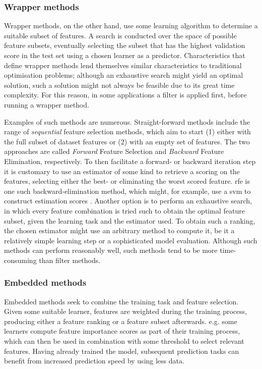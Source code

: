 \documentclass{article}
\begin{document}
\subsubsection{Wrapper methods}
Wrapper methods, on the other hand, use some learning algorithm to determine a suitable subset of features. A search is conducted over the space of possible feature subsets, eventually selecting the subset that has the highest validation score in the test set using a chosen learner as a predictor. Characteristics that define wrapper methods lend themselves similar characteristics to traditional optimisation problems; although an exhaustive search might yield an optimal solution, such a solution might not always be feasible due to its great time complexity. For this reason, in some applications a filter is applied first, before running a wrapper method.

Examples of such methods are numerous. Straight-forward methods include the range of \textit{sequential} feature selection methods, which aim to start (1) either with the full subset of dataset features or (2) with an empty set of features. The two approaches are called \textit{Forward} Feature Selection and \textit{Backward} Feature Elimination, respectively. To then facilitate a forward- or backward iteration step it is customary to use an estimator of some kind to retrieve a scoring on the features, selecting either the best- or eliminating the worst scored feature. \gls{rfe} is one such backward-elimination method, which might, for example, use a \gls{svm} to construct estimation scores \citep{maldonado_weber_2009}. Another option is to perform an exhaustive search, in which every feature combination is tried such to obtain the optimal feature subset, given the learning task and the estimator used. To obtain such a ranking, the chosen estimator might use an arbitrary method to compute it, be it a relatively simple learning step or a sophisticated model evaluation. Although such methods can perform reasonably well, such methods tend to be more time-consuming than filter methods.

\subsubsection{Embedded methods}
Embedded methods seek to combine the training task and feature selection. Given some suitable learner, features are weighted during the training process, producing either a feature ranking or a feature subset afterwards. e.g. some learners compute feature importance scores as part of their training process, which can then be used in combination with some threshold to select relevant features. Having already trained the model, subsequent prediction tasks can benefit from increased prediction speed by using less data.
\end{document}
